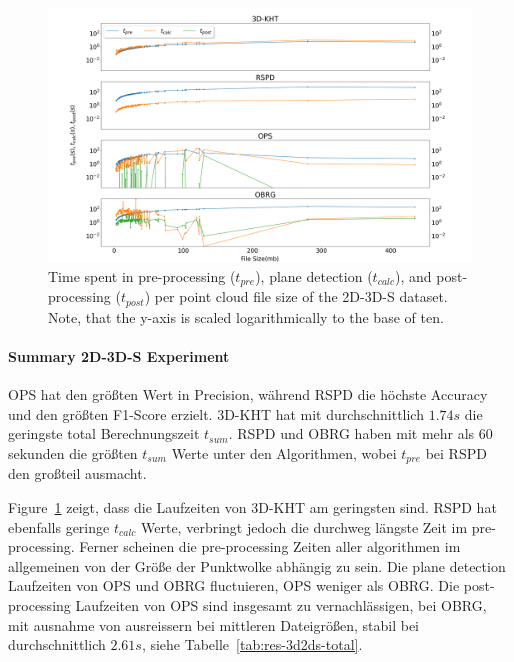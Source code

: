 \documentclass[main.tex]{subfiles}
\begin{document}
\begin{figure}[H]
    \centering
    \includegraphics[width=\textwidth]{images/SDsizetime.png}
    \caption[Time per Cloud size 2D-3D-S]{Time spent in pre-processing ($t_{pre}$), plane detection ($t_{calc}$), 
    and post-processing ($t_{post}$) per point cloud file size of the 2D-3D-S dataset. Note, that the y-axis is 
    scaled logarithmically to the base of ten.}
    \label{fig:sizetimestanford}
\end{figure}


\paragraph{Summary 2D-3D-S Experiment}
OPS hat den größten Wert in Precision, während RSPD die höchste Accuracy und den größten F1-Score erzielt.
3D-KHT hat mit durchschnittlich $1.74s$ die geringste total Berechnungszeit $t_{sum}$. RSPD und OBRG haben mit mehr als 60 sekunden
die größten $t_{sum}$ Werte unter den Algorithmen, wobei $t_{pre}$ bei RSPD den großteil ausmacht.

Figure~\ref{fig:sizetimestanford} zeigt, dass die Laufzeiten von 3D-KHT am geringsten sind. RSPD hat ebenfalls geringe $t_{calc}$ Werte,
verbringt jedoch die durchweg längste Zeit im pre-processing.
Ferner scheinen die pre-processing Zeiten aller algorithmen im allgemeinen von der Größe der Punktwolke abhängig zu sein.
Die plane detection Laufzeiten von OPS und OBRG fluctuieren, OPS weniger als OBRG. 
Die post-processing Laufzeiten von OPS sind insgesamt zu vernachlässigen, bei OBRG, mit ausnahme von ausreissern bei mittleren Dateigrößen,
 stabil bei durchschnittlich $2.61s$, siehe Tabelle~\ref{tab:res-3d2ds-total}.     
\end{document}
